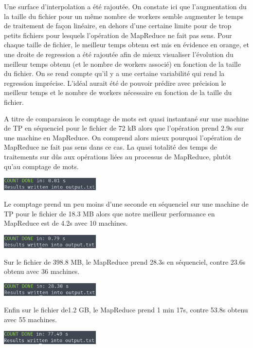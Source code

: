 \documentclass[11pt,a4paper]{article}
\begin{document}
Une surface d'interpolation a été rajoutée. On constate ici que l'augmentation du la taille du fichier pour un même nombre de workers semble augmenter le temps de traitement de façon linéaire, en dehors d'une certaine limite pour de trop petits fichiers pour lesquels l'opération de MapReduce ne fait pas sens. Pour chaque taille de fichier, le meilleur temps obtenu est mis en évidence en orange, et une droite de regression a été rajoutée afin de mieux visualiser l'évolution du meilleur temps obtenu (et le nombre de workers associé) en fonction de la taille du fichier. On se rend compte qu'il y a une certaine variabilité qui rend la regression imprécise. L'idéal aurait été de pouvoir prédire avec précision le meilleur temps et le nombre de workers nécessaire en fonction de la taille du fichier.

A titre de comparaison le comptage de mots est quasi instantané sur une machine de TP en séquenciel pour le fichier de 72 kB alors que l'opération prend 2.9s sur une machine en MapReduce. On comprend alors mieux pourquoi l'opération de MapReduce ne fait pas sens dans ce cas. La quasi totalité des temps de traitements sur dûs aux opérations liées au processus de MapReduce, plutôt qu'au comptage de mots.

\includegraphics[width=5cm]{screenshot_seq0.png}

Le comptage prend un peu moins d'une seconde en séquenciel sur une machine de TP pour le fichier de 18.3 MB alors que notre meilleur performance en MapReduce est de 4.2s avec 10 machines.

\includegraphics[width=5cm]{screenshot_seq1.png}

Sur le fichier de 398.8 MB, le MapReduce prend 28.3s en séquenciel, contre 23.6s obtenu avec 36 machines.

\includegraphics[width=5cm]{screenshot_seq2.png}

Enfin sur le fichier de1.2 GB, le MapReduce prend 1 min 17s, contre 53.8s obtenu avec 55 machines.

\includegraphics[width=5cm]{screenshot_seq3.png}
\end{document}
